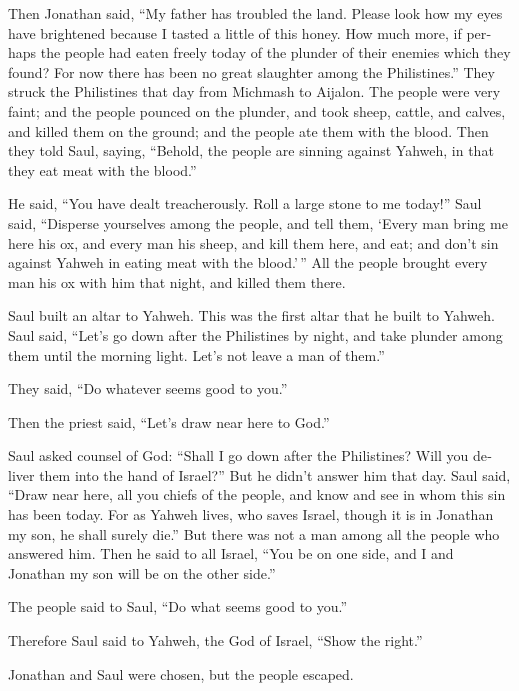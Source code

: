\begin{paracol}{2}
\begin{otherlanguage}{english}
 Then Jonathan said, ``My father has troubled the land.
Please look how my eyes have brightened because I tasted a little of
this honey.  How much more, if perhaps the people had
eaten freely today of the plunder of their enemies which they found? For
now there has been no great slaughter among the Philistines.''
 They struck the Philistines that day from Michmash to
Aijalon. The people were very faint;  and the people
pounced on the plunder, and took sheep, cattle, and calves, and killed
them on the ground; and the people ate them with the blood.
 Then they told Saul, saying, ``Behold, the people are
sinning against Yahweh, in that they eat meat with the blood.''

He said, ``You have dealt treacherously. Roll a large stone to me
today!''  Saul said, ``Disperse yourselves among the
people, and tell them, `Every man bring me here his ox, and every man
his sheep, and kill them here, and eat; and don't sin against Yahweh in
eating meat with the blood.'\,'' All the people brought every man his ox
with him that night, and killed them there.

 Saul built an altar to Yahweh. This was the first altar
that he built to Yahweh.  Saul said, ``Let's go down
after the Philistines by night, and take plunder among them until the
morning light. Let's not leave a man of them.''

They said, ``Do whatever seems good to you.''

Then the priest said, ``Let's draw near here to God.''

 Saul asked counsel of God: ``Shall I go down after the
Philistines? Will you deliver them into the hand of Israel?'' But he
didn't answer him that day.  Saul said, ``Draw near here,
all you chiefs of the people, and know and see in whom this sin has been
today.  For as Yahweh lives, who saves Israel, though it
is in Jonathan my son, he shall surely die.'' But there was not a man
among all the people who answered him.  Then he said to
all Israel, ``You be on one side, and I and Jonathan my son will be on
the other side.''

The people said to Saul, ``Do what seems good to you.''

 Therefore Saul said to Yahweh, the God of Israel, ``Show
the right.''

Jonathan and Saul were chosen, but the people escaped.


\end{otherlanguage}
\end{paracol}
